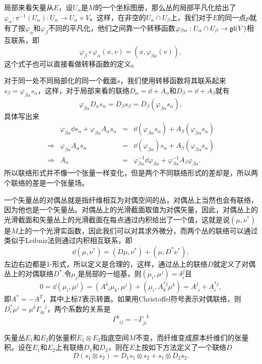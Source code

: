 局部来看矢量从$E$，设$U_\alpha$是$M$的一个坐标图册，那么丛的局部平凡化给出了$\varphi_\alpha:\pi^{-1}(U_\alpha):U_\alpha\to U_\alpha\times V$。这样，在非空的$U_\alpha\cap U_\beta$上，我们对于$E$的同一点$p$就有了按$\varphi_\alpha$和$\varphi_\beta$不同的平凡化，他们之间靠一个转移函数$\varphi_{\beta\alpha}:U_\alpha\cap U_\beta\to \mathfrak{gl}(V)$相互联系，即
\[
	\varphi_\beta\circ \varphi_\alpha (x,v)=(x,\varphi_{\beta\alpha}(v)),
\]
这个式子也可以直接看做转移函数的定义。

对于同一处不同局部化的同一个截面$s$，我们使用转移函数将其联系起来$s_\beta=\varphi_{\beta\alpha}s_\alpha$，这样，对于局部来看的联络$D_\alpha=\dd+A_\alpha$和$D_\beta=\dd+A_\beta$就有
\[
	\varphi_{\beta\alpha}D_\alpha s_\alpha=D_\beta s_\beta=D_\beta (\varphi_{\beta\alpha}s_\alpha),
\]
具体写出来
\[
\begin{array}{llcl}
	&\varphi_{\beta\alpha}\dd s_\alpha+\varphi_{\beta\alpha}A_\alpha s_\alpha&=&\dd(\varphi_{\beta\alpha}s_\alpha)+A_\beta(\varphi_{\beta\alpha}s_\alpha)\\
	\Rightarrow &\varphi_{\beta\alpha}A_\alpha s_\alpha&=&\dd(\varphi_{\beta\alpha})s_\alpha+A_\beta(\varphi_{\beta\alpha}s_\alpha)\\
	\Rightarrow &A_\alpha &=&\varphi_{\beta\alpha}^{-1}\dd\varphi_{\beta\alpha}+\varphi_{\beta\alpha}^{-1}A_\beta \varphi_{\beta\alpha}.
\end{array}
\]
所以联络形式并不像一个张量一样变化，但是两个不同联络形式的差却是，所以两个联络的差是一个张量场。

一个矢量丛的对偶丛就是指纤维相互为对偶空间的丛，对偶丛上当然也会有联络，因为他也是一个矢量丛。对偶丛上的光滑截面取值为对偶矢量，因此，对偶丛上的光滑截面和矢量丛上的光滑截面在每点通过内积给出了一个值，这就是说$(\mu,\nu^*)$是$M$上的一个光滑实函数，因此我们可以对其求外微分，而两个丛的联络可以通过类似于Leibniz法则通过内积相互联系，即
\[
	\dd (\mu,\nu^*)=(D\mu,\nu^*)+(\mu,D^*\nu^*),
\]
左边右边都是1-形式，所以定义是合理的，这样，通过丛上的联络$D$就定义了对偶丛上的对偶联络$D^*$.令$\mu_j$是局部的一组基，则$(\mu_i,\mu^j)=\delta_{i}^j$且
\[
	0=\dd(\mu_i,\mu^j)=(A^k_{\phantom{k}i}\mu_k,\mu^j)+(\mu_i, A_{k}^{*j}\mu^k)=A^j_{\phantom{j}i}+A_{i}^{*j},
\]
即$A^*=-A^T$，其中上标$T$表示转置。如果用Christoffel符号表示对偶联络，则$D^*_{i}\mu^j=\mu^k\Gamma_{ki}^{\phantom{ki}j}$，两个系数的关系是
\[
	\Gamma_{\phantom{k}ij}^{k}=-\Gamma_{ji}^{\phantom{ji}k}
\]

\para 矢量丛$E_1$和$E_2$的张量积$E_1\otimes E_2$指底空间$M$不变，而纤维变成原本纤维们的张量积。设在$E_1$和$E_2$上有联络$D_1$和$D_2$，则在$E$上按如下方法定义了一个联络$D$
\[
	D(s_1\otimes s_2)=D_1s_1\otimes  s_2+s_1\otimes D_2s_2.
\]

